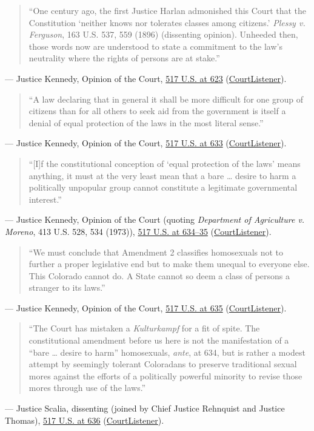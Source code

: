 \documentclass[12pt]{article}
\begin{document}
\begin{quote}
``One century ago, the first Justice Harlan admonished this Court that the Constitution `neither knows nor tolerates classes among citizens.' \textit{Plessy v. Ferguson}, 163 U.S. 537, 559 (1896) (dissenting opinion). Unheeded then, those words now are understood to state a commitment to the law's neutrality where the rights of persons are at stake.''
\end{quote}
\noindent --- Justice Kennedy, Opinion of the Court, \href{https://supreme.justia.com/cases/federal/us/517/620/}{517 U.S. at 623} (\href{https://www.courtlistener.com/opinion/118027/romer-v-evans/}{CourtListener}).

\begin{quote}
``A law declaring that in general it shall be more difficult for one group of citizens than for all others to seek aid from the government is itself a denial of equal protection of the laws in the most literal sense.''
\end{quote}
\noindent --- Justice Kennedy, Opinion of the Court, \href{https://supreme.justia.com/cases/federal/us/517/620/}{517 U.S. at 633} (\href{https://www.courtlistener.com/opinion/118027/romer-v-evans/}{CourtListener}).

\begin{quote}
``[I]f the constitutional conception of `equal protection of the laws' means anything, it must at the very least mean that a bare \dots{} desire to harm a politically unpopular group cannot constitute a legitimate governmental interest.''
\end{quote}
\noindent --- Justice Kennedy, Opinion of the Court (quoting \textit{Department of Agriculture v. Moreno}, 413 U.S. 528, 534 (1973)), \href{https://supreme.justia.com/cases/federal/us/517/620/}{517 U.S. at 634--35} (\href{https://www.courtlistener.com/opinion/118027/romer-v-evans/}{CourtListener}).

\begin{quote}
``We must conclude that Amendment 2 classifies homosexuals not to further a proper legislative end but to make them unequal to everyone else. This Colorado cannot do. A State cannot so deem a class of persons a stranger to its laws.''
\end{quote}
\noindent --- Justice Kennedy, Opinion of the Court, \href{https://supreme.justia.com/cases/federal/us/517/620/}{517 U.S. at 635} (\href{https://www.courtlistener.com/opinion/118027/romer-v-evans/}{CourtListener}).

\begin{quote}
``The Court has mistaken a \textit{Kulturkampf} for a fit of spite. The constitutional amendment before us here is not the manifestation of a ``bare \dots{} desire to harm'' homosexuals, \textit{ante}, at 634, but is rather a modest attempt by seemingly tolerant Coloradans to preserve traditional sexual mores against the efforts of a politically powerful minority to revise those mores through use of the laws.''
\end{quote}
\noindent --- Justice Scalia, dissenting (joined by Chief Justice Rehnquist and Justice Thomas), \href{https://supreme.justia.com/cases/federal/us/517/620/}{517 U.S. at 636} (\href{https://www.courtlistener.com/opinion/118027/romer-v-evans/}{CourtListener}).
\end{document}
